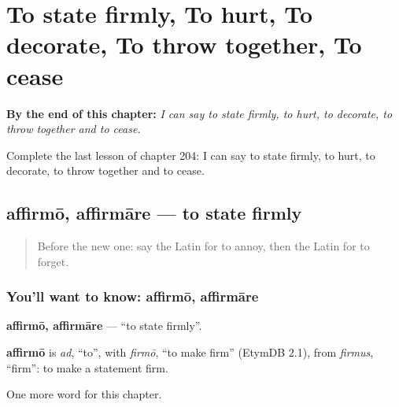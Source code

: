 
\chapter{To state firmly, To hurt, To decorate, To throw together, To cease}
\label{ch:la-to-state-firmly-to-hurt-to-decorate-to-throw-together-to-cease}

\begin{chapteropening}
\textbf{By the end of this chapter:} \emph{I can say to state firmly, to hurt, to decorate, to throw together and to cease.}

Complete the last lesson of chapter 204: I can say to state firmly, to hurt, to decorate, to throw together and to cease.
\end{chapteropening}

\section[affirmō, affirmāre]{affirmō, affirmāre — to state firmly}

\label{lesson:LA-C204-affirmo}



\begin{quote}
Before the new one: say the Latin for to annoy, then the Latin for to forget.
\end{quote}

\subsection*{You'll want to know: affirmō, affirmāre}
\textbf{affirmō, affirmāre} — \textquotedblleft{}to state firmly\textquotedblright{}.

\begin{cousinweb}
\textbf{affirmō} is \emph{ad}, \textquotedblleft{}to\textquotedblright{}, with \emph{firmō}, \textquotedblleft{}to make firm\textquotedblright{} (EtymDB 2.1), from \emph{firmus}, \textquotedblleft{}firm\textquotedblright{}: to make a statement firm.
\end{cousinweb}

\begin{grammarlens}[title={What you've built}]
One more word for this chapter.
\end{grammarlens}

